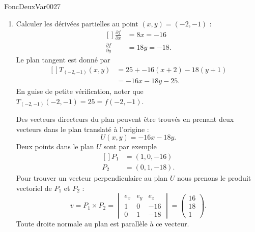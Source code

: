 
\begin{corrige}{FoncDeuxVar0027}

	\begin{enumerate}

		\item
			Calculer les dérivées partielles au point $(x,y)=(-2,-1)$ :
			\begin{equation}
				\begin{aligned}[]
					\frac{ \partial f }{ \partial x }&=8x=-16\\
					\frac{ \partial f }{ \partial y }&=18y=-18.
				\end{aligned}
			\end{equation}
			Le plan tangent est donné par
			\begin{equation}
				\begin{aligned}[]
					T_{(-2,-1)}(x,y)&=25+-16(x+2)-18(y+1)\\
						&=-16x-18y-25.
				\end{aligned}
			\end{equation}
			En guise de petite vérification, noter que $T_{(-2,-1)}(-2,-1)=25=f(-2,-1)$.

			Des vecteurs directeurs du plan peuvent être trouvés en prenant deux vecteurs dans le plan translaté à l'origine :
			\begin{equation}
				U(x,y)=-16x-18y.
			\end{equation}
			Deux points dans le plan $U$ sont par exemple
			\begin{equation}
				\begin{aligned}[]
					P_1&=(1,0,-16)\\
					P_2&=(0,1,-18).
				\end{aligned}
			\end{equation}
			Pour trouver un vecteur perpendiculaire au plan $U$ nous prenons le produit vectoriel de $P_1$ et $P_2$ :
			\begin{equation}
				v=P_1\times P_2=\begin{vmatrix}
					e_x	&	e_y	&	e_z	\\
					1	&	0	&	-16	\\
					0	&	1	&	-18
				\end{vmatrix}=\begin{pmatrix}
					16	\\ 
					18	\\ 
					1	
				\end{pmatrix}.
			\end{equation}
			Toute droite normale au plan est parallèle à ce vecteur.


\end{enumerate}
\end{corrige}
